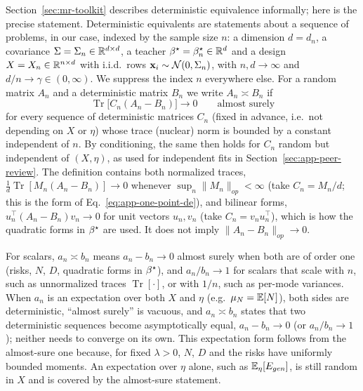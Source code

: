 {{Section~\ref{sec:mr-toolkit} describes deterministic equivalence
informally; here is the precise statement.  Deterministic equivalents are
statements about a sequence of problems, in our case, indexed by the sample size $n$: a dimension $d=d_n$, a covariance $\Sigma=\Sigma_n\in\mathbb{R}^{d\times d}$, a teacher ${\beta^{\star}}=\beta^{\star}_n\in\mathbb{R}^d$ and a design $X=X_n\in\mathbb{R}^{n\times d}$ with i.i.d.\ rows $\mathbf{x}_i\sim\mathcal N(0,\Sigma_n)$, with $n,d\to\infty$ and $d/n\to\gamma\in(0,\infty)$.  
We suppress the index $n$ everywhere else.  For a random matrix $A_n$ and a deterministic matrix $B_n$ we write
$A_n\asymp B_n$ if
\[
\operatorname{Tr}\big[C_n(A_n-B_n)\big]\to0\qquad\text{almost surely}
\]
for every sequence of deterministic matrices $C_n$ (fixed in advance, i.e.\
not depending on $X$ or $\eta$) whose trace (nuclear) norm is bounded by a
constant independent of $n$.  By conditioning, the same then holds for $C_n$
random but independent of $(X,\eta)$, as used for independent fits in
Section~\ref{sec:app-peer-review}.  The definition contains both normalized
traces, $\tfrac1d\operatorname{Tr}[M_n(A_n-B_n)]\to0$ whenever
$\sup_n\|M_n\|_{op}<\infty$ (take $C_n=M_n/d$; this is the form of
Eq.~\ref{eq:app-one-point-de}), and bilinear forms,
$u_n^\top(A_n-B_n)v_n\to0$ for unit vectors $u_n,v_n$ (take
$C_n=v_nu_n^\top$), which is how the quadratic forms in ${\beta^{\star}}$ are used.
It does not imply $\|A_n-B_n\|_{op}\to0$.

For scalars, $a_n\asymp b_n$ means $a_n-b_n\to0$ almost surely when both are
of order one (risks, $N$, $D$, quadratic forms in ${\beta^{\star}}$), and
$a_n/b_n\to1$ for scalars that scale with $n$, such as unnormalized traces
$\operatorname{Tr}[\cdot]$, or with $1/n$, such as per-mode variances.  When
$a_n$ is an expectation over both $X$ and $\eta$ (e.g.\ $\mu_N=\mathbb{E}[N]$), both
sides are deterministic, ``almost surely'' is vacuous, and $a_n\asymp b_n$
states that two deterministic sequences become asymptotically equal,
$a_n-b_n\to0$ (or $a_n/b_n\to1$); neither needs to converge on its own.  This
expectation form follows from the almost-sure one because, for fixed
$\lambda>0$, $N$, $D$ and the risks have uniformly bounded moments.  An
expectation over $\eta$ alone, such as $\mathbb{E}_\eta[E_{gen}]$, is still random in
$X$ and is covered by the almost-sure statement.

}}
